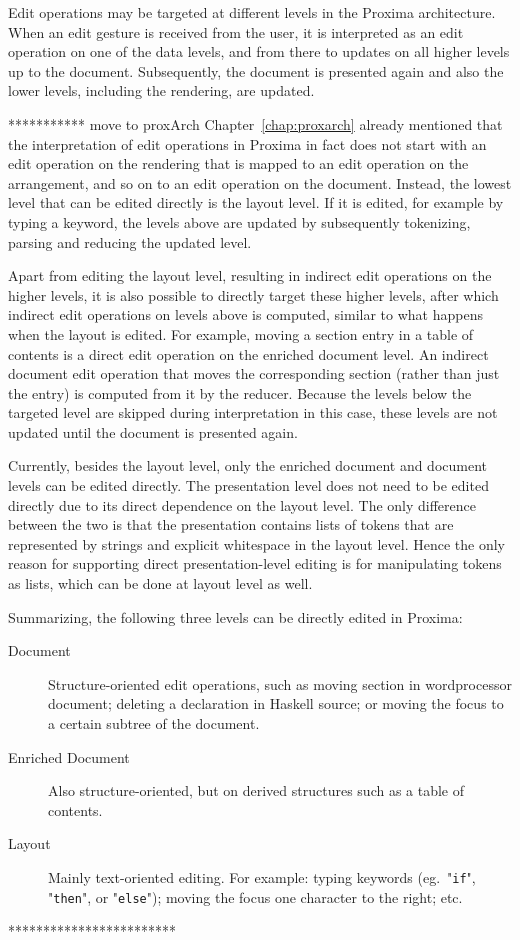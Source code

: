 
\bc Edit operations may be targeted at different levels in the Proxima architecture. When an edit gesture is received from the user, it is interpreted as an edit operation on one of the data levels, and from there to updates on all higher levels up to the document. Subsequently, the document is presented again and also the lower levels, including the rendering, are updated. \ec


*********** move to proxArch
Chapter~\ref{chap:proxarch} already mentioned that the interpretation of edit operations in Proxima in fact does not start with an edit operation on the rendering that is mapped to an edit operation on the arrangement, and so on to an edit operation on the document. Instead, the lowest level that can be edited directly is the layout level. If it is edited, for example by typing a keyword, the levels above are updated by subsequently tokenizing, parsing and reducing the updated level.

Apart from editing the layout level, resulting in indirect edit operations on the higher levels, it is also possible to directly target these higher levels, after which indirect edit operations on levels above is computed, similar to what happens when the layout is edited. For example, moving a section entry in a table of contents is a direct edit operation on the enriched document level. An indirect document edit operation that moves the corresponding section (rather than just the entry) is computed from it by the reducer. Because the levels below the targeted level are skipped during interpretation in this case, these levels are not updated until the document is presented again. 

Currently, besides the layout level, only the enriched document and document levels can be edited directly. The presentation level does not need to be edited directly due to its direct dependence on the layout level. The only difference between the two is that the presentation contains lists of tokens that are represented by strings and explicit whitespace in the layout level. Hence the only reason for supporting direct presentation-level editing is for manipulating tokens as lists, which can be done at layout level as well.

Summarizing, the following three levels can be directly edited in Proxima:

\begin{description}
\item[Document] Structure-oriented edit operations, such as moving section in wordprocessor document; deleting a declaration in Haskell source; or moving the focus to a certain subtree of the document.
\item[Enriched Document] Also structure-oriented, but on derived structures such as a table of contents.
\item[Layout] Mainly text-oriented editing. For example: typing keywords (eg.\ "\verb|if|", "\verb|then|", or "\verb|else|"); moving the focus one character to the right; etc.
\end{description}
************************


